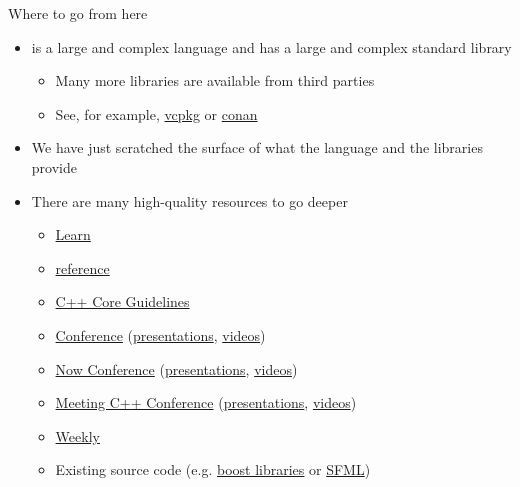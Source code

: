 \begin{frame}{Where to go from here}

  \begin{itemize}
  \item \Cpp{} is a large and complex language and has a large and complex
    standard library
    \begin{itemize}
    \item Many more libraries are available from third parties
    \item See, for example, \href{https://vcpkg.io/}{vcpkg} or
      \href{https://conan.io/}{conan}
    \end{itemize}
  \item We have just scratched the surface of what the language and the
    libraries provide
  \item<2-> There are many high-quality resources to go deeper
    \begin{itemize}
    \item \href{https://www.learncpp.com/}{Learn \Cpp{}}
    \item \href{https://cppreference.com/}{\Cpp{} reference}
    \item
      \href{https://isocpp.github.io/CppCoreGuidelines/CppCoreGuidelines}{C++
        Core Guidelines}
    \item \href{https://cppcon.org/}{\Cpp{} Conference}
      (\href{https://github.com/cppcon}{presentations},
      \href{https://youtube.com/cppcon}{videos})
    \item \href{https://cppnow.org/}{\Cpp{} Now Conference}
      (\href{https://github.com/boostcon}{presentations},
      \href{https://youtube.com/boostcon}{videos})
    \item \href{https://meetingcpp.com/}{Meeting C++ Conference}
      (\href{https://meetingcpp.com/mcpp/slides/}{presentations},
      \href{https://www.youtube.com/c/MeetingCPP}{videos})
    \item \href{https://www.youtube.com/@cppweekly}{\Cpp{} Weekly}
    \item Existing source code (e.g. \href{https://www.boost.org/}{boost
        libraries} or \href{https://www.sfml-dev.org/}{SFML})
    \end{itemize}
  \end{itemize}
\end{frame}

